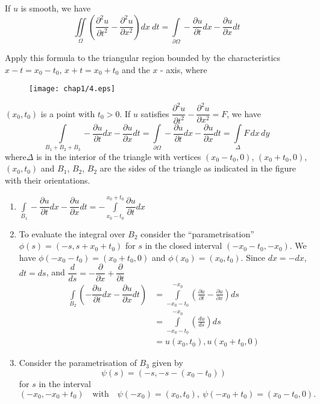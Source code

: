 \begin{coro*}
If $u$ is smooth, we have
$$
\iint\limits_{\Omega}\left(\frac{\partial^{2}u}{\partial t^{2}}-\frac{\partial^{2}u}{\partial x^{2}}\right)dx \ dt = \int\limits_{\partial\Omega}-\frac{\partial u}{\partial t}dx-\frac{\partial u}{\partial x}dt
$$

Apply this formula to the triangular region bounded by the characteristics $x-t=x_{0}-t_{0}$, $x+t=x_{0}+t_{0}$ and the $x$ - axis, where
\begin{figure}[H]
\centering
\texttt{[image: chap1/4.eps]}
\end{figure}
\noindent
$(x_{0},t_{0})$ is a point with $t_{0}>0$. If $u$ satisfies $\dfrac{\partial^{2}u}{\partial t^{2}}-\dfrac{\partial^{2}u}{\partial x^{2}}=F$, we have
$$
\int\limits_{B_{1}+B_{2}+B_{3}}-\frac{\partial u}{\partial t}dx-\dfrac{\partial u}{\partial x}dt=\int\limits_{\partial \Omega}-\frac{\partial u}{\partial t}dx-\dfrac{\partial u}{\partial x}dt=\int\limits_{\Delta} F\,dx\,dy
$$
where\pageoriginale $\Delta$ is in the interior of the triangle with vertices $(x_{0}-t_{0},0)$, $(x_{0}+t_{0},0)$, $(x_{0},t_{0})$ and $B_{1}$, $B_{2}$, $B_{2}$ are the sides of the triangle as indicated in the figure with their orientations.
\begin{enumerate}
\renewcommand{\labelenumi}{\rm(\theenumi)}
\item $\int\limits_{B_{1}}-\dfrac{\partial u}{\partial t}dx-\dfrac{\partial u}{\partial x}dt=-\int\limits^{x_{0}+t_{0}}_{x_{0}-t_{0}}\dfrac{\partial u}{\partial t}dx$

\item To evaluate the integral over $B_{2}$ consider the ``parametrisation'' $\phi(s)=(-s,s+x_{0}+t_{0})$ for $s$ in the closed interval $(-x_{0}-t_{0},-x_{0})$. We have $\phi(-x_{0}-t_{0})=(x_{0}+t_{0},0)$ and $\phi(x_{0})=(x_{0},t_{0})$. Since $dx=-dx$, $dt=ds$, and $\dfrac{d}{ds}=-\dfrac{\partial}{\partial x}+\dfrac{\partial}{\partial t}$
\begin{align*}
\int\limits_{B_{2}} \left(-\dfrac{\partial u}{\partial t}dx-\dfrac{\partial u}{\partial x}dt\right) &= \int\limits^{-x_{0}}_{-x_{0}-t_{0}}\left(\frac{\partial u}{\partial t}-\frac{\partial u}{\partial x}\right)ds\\[4pt]
&= \int\limits^{-x_{0}}_{-x_{0}-t_{0}}\left(\frac{du}{ds}\right)ds\\[4pt]
&= u(x_{0},t_{0}), u(x_{0}+t_{0},0)
\end{align*}

\item Consider the parametrisation of $B_{3}$ given by
$$
\psi(s)=(-s,-s-(x_{0}-t_{0}))
$$
for $s$ in the interval
$$
(-x_{0},-x_{0}+t_{0})\quad\text{with}\quad \psi(-x_{0})=(x_{0},t_{0}), \ \psi(-x_{0}+t_{0})=(x_{0}-t_{0},0).
$$


\end{enumerate}
\end{coro*}
